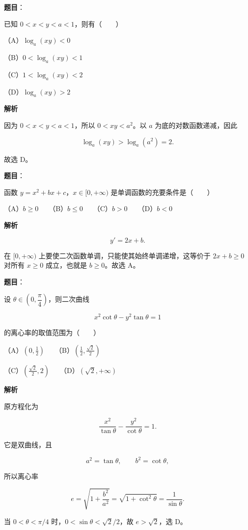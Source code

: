 \begin{answer}

\textbf{题目}：

已知 $0<x<y<a<1$，则有\mbox{（　　）}

（A）$\log_a(xy)<0$

（B）$0<\log_a(xy)<1$

（C）$1<\log_a(xy)<2$

（D）$\log_a(xy)>2$

\textbf{解析}

因为 $0<x<y<a<1$，所以 $0<xy<a^2$。以 $a$ 为底的对数函数递减，因此

\nopagebreak[4]
\[
\log_a(xy)>\log_a(a^2)=2.
\]

故选 D。


\end{answer}
\begin{answer}

\textbf{题目}：

函数 $y=x^2+bx+c$，$x\in[0,+\infty)$ 是单调函数的充要条件是\mbox{（　　）}

（A）$b\geqslant0$　　（B）$b\leqslant0$　　（C）$b>0$　　（D）$b<0$

\textbf{解析}

\nopagebreak[4]
\[
y'=2x+b.
\]

在 $[0,+\infty)$ 上要使二次函数单调，只能使其始终单调递增，这等价于 $2x+b\geqslant0$ 对所有 $x\geqslant0$ 成立，也就是 $b\geqslant0$。故选 A。


\end{answer}
\begin{answer}

\textbf{题目}：

设 $\theta\in\left(0,\dfrac\pi4\right)$，则二次曲线

\nopagebreak[4]
\[
x^2\cot\theta-y^2\tan\theta=1
\]

的离心率的取值范围为\mbox{（　　）}

（A）$\left(0,\frac12\right)$　　（B）$\left(\frac12,\frac{\sqrt2}{2}\right)$

（C）$\left(\frac{\sqrt2}{2},2\right)$　　（D）$(\sqrt2,+\infty)$

\textbf{解析}

原方程化为

\nopagebreak[4]
\[
\frac{x^2}{\tan\theta}-\frac{y^2}{\cot\theta}=1.
\]

它是双曲线，且

\nopagebreak[4]
\[
a^2=\tan\theta,\qquad b^2=\cot\theta,
\]

所以离心率

\nopagebreak[4]
\[
e=\sqrt{1+\frac{b^2}{a^2}}
=\sqrt{1+\cot^2\theta}
=\frac1{\sin\theta}.
\]

当 $0<\theta<\pi/4$ 时，$0<\sin\theta<\sqrt2/2$，故 $e>\sqrt2$，选 D。


\end{answer}
